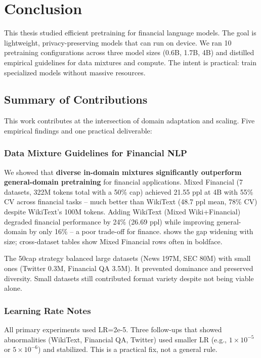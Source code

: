 \chapter{Conclusion}

This thesis studied efficient pretraining for financial language models. The goal is lightweight, privacy-preserving models that can run on device. We ran 10 pretraining configurations across three model sizes (0.6B, 1.7B, 4B) and distilled empirical guidelines for data mixtures and compute. The intent is practical: train specialized models without massive resources.

\section{Summary of Contributions}

This work contributes at the intersection of domain adaptation and scaling. Five empirical findings and one practical deliverable:

\subsection{Data Mixture Guidelines for Financial NLP}

We showed that \textbf{diverse in-domain mixtures significantly outperform general-domain pretraining} for financial applications. Mixed Financial (7 datasets, 322M tokens total with a 50\% cap) achieved 21.55 ppl at 4B with 55\% CV across financial tasks -- much better than WikiText (48.7 ppl mean, 78\% CV) despite WikiText's 100M tokens. Adding WikiText (Mixed Wiki+Financial) degraded financial performance by 24\% (26.69 ppl) while improving general-domain by only 16\% -- a poor trade-off for finance.  shows the gap widening with size; cross-dataset tables show Mixed Financial rows often in boldface.

The 50cap strategy balanced large datasets (News 197M, SEC 80M) with small ones (Twitter 0.3M, Financial QA 3.5M). It prevented dominance and preserved diversity. Small datasets still contributed format variety despite not being viable alone.

\subsection{Learning Rate Notes}

All primary experiments used LR=2e-5. Three follow-ups that showed abnormalities (WikiText, Financial QA, Twitter) used smaller LR (e.g., $1\times10^{-5}$ or $5\times10^{-6}$) and stabilized. This is a practical fix, not a general rule.

